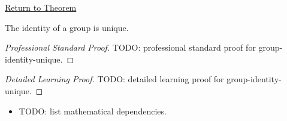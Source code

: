 \newpage
{}
\label{prf:group-identity-unique}

\begin{remark*}[Return]
\hyperref[prop:group-identity-unique]{Return to Theorem}
\end{remark*}

\begin{proposition*}
The identity of a group is unique.
\end{proposition*}

\begin{proof}[Professional Standard Proof]
\LRAProofBodyStart
TODO: professional standard proof for group-identity-unique.
\end{proof}

\begin{proof}[Detailed Learning Proof]
\LRAProofBodyStart
TODO: detailed learning proof for group-identity-unique.
\end{proof}

\begin{remark*}
\end{remark*}

\begin{dependencies}
\begin{itemize}
  \item TODO: list mathematical dependencies.
\end{itemize}
\end{dependencies}

\clearpage
